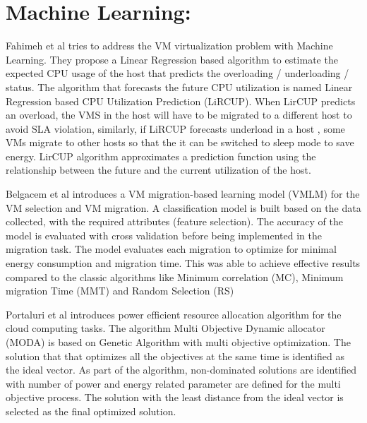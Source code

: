 \documentclass[a4paper,12pt]{Classes/RoboticsLaTeX}
\begin{document}
    \section{Machine Learning:}
    
    Fahimeh et al \cite{farahnakian2013lircup} tries to address the VM virtualization problem with Machine Learning. They propose a Linear Regression based algorithm to estimate the expected CPU usage of the host that predicts the overloading / underloading / status. The algorithm that forecasts the future CPU utilization is named Linear Regression based CPU Utilization Prediction (LiRCUP). When LirCUP predicts an overload, the VMS in the host will have to be migrated to a different host to avoid SLA violation, similarly, if LiRCUP forecasts underload in a host , some VMs migrate to other hosts so that the it can be switched to sleep mode to save energy. LirCUP algorithm approximates a prediction function using the relationship between the future and the current utilization of the host.
    
    Belgacem et al \cite{belgacem2023machine} introduces a VM migration-based learning model (VMLM) for the VM selection and VM migration. A classification model is built based on the data collected, with the required attributes (feature selection). The accuracy of the model is evaluated with cross validation before being implemented in the migration task. The model evaluates each migration to optimize for minimal energy consumption and migration time. This was able to achieve effective results compared to the classic algorithms like Minimum correlation (MC), Minimum migration Time (MMT) and Random Selection (RS)
    
    Portaluri et al \cite{portaluri2017power} introduces power efficient resource allocation algorithm for the cloud computing tasks. The algorithm Multi Objective Dynamic allocator (MODA) is based on Genetic Algorithm with multi objective optimization. The solution that that optimizes all the objectives at the same time is identified as the ideal vector. As part of the algorithm, non-dominated solutions are identified with number of power and energy related parameter are defined for the multi objective process. The solution with the least distance from the ideal vector is selected as the final optimized solution. 
    
\end{document}
